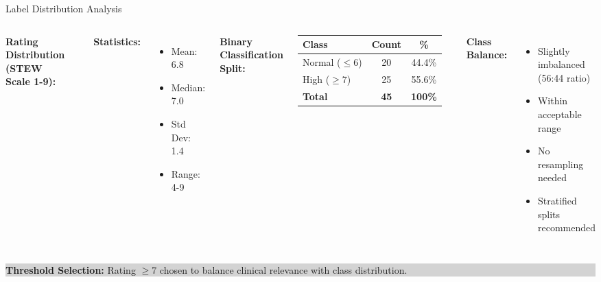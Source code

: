 \documentclass[aspectratio=169]{beamer}
\begin{document}
\begin{frame}{Label Distribution Analysis}
\begin{columns}[c]
\textbf{Rating Distribution (STEW Scale 1-9):}

\begin{center}
\end{center}

\textbf{Statistics:}
\begin{itemize}\small
    \item Mean: 6.8
    \item Median: 7.0
    \item Std Dev: 1.4
    \item Range: 4-9
\end{itemize}

\textbf{Binary Classification Split:}

\begin{table}[h]
\small
\begin{tabular}{@{}lcc@{}}
\toprule
\textbf{Class} & \textbf{Count} & \textbf{\%} \\
\midrule
Normal ($\leq$6) & 20 & 44.4\% \\
High ($\geq$7) & 25 & 55.6\% \\
\midrule
\textbf{Total} & \textbf{45} & \textbf{100\%} \\
\bottomrule
\end{tabular}
\end{table}

\vspace{5mm}

\textbf{Class Balance:}
\begin{itemize}
    \item Slightly imbalanced (56:44 ratio)
    \item Within acceptable range
    \item No resampling needed
    \item Stratified splits recommended
\end{itemize}
\end{columns}

\vspace{3mm}
\begin{center}
\colorbox{lightgray}{\parbox{0.9\textwidth}{\centering\small
\textbf{Threshold Selection:} Rating $\geq$7 chosen to balance clinical relevance with class distribution.
}}
\end{center}
\end{frame}
\end{document}
